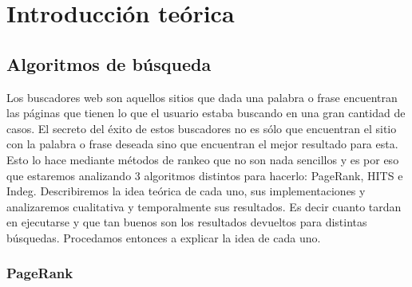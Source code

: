 \section{Introducci\'on te\'orica}

\subsection{Algoritmos de búsqueda}

Los buscadores web son aquellos sitios que dada una palabra o frase encuentran las páginas que tienen lo que el usuario estaba buscando en una gran cantidad de casos. El secreto del éxito de estos buscadores no es sólo que encuentran el sitio con la palabra o frase deseada sino que encuentran el mejor resultado para esta. \\
Esto lo hace mediante métodos de rankeo que no son nada sencillos y es por eso que estaremos analizando 3 algoritmos distintos para hacerlo: PageRank, HITS e Indeg. Describiremos la idea teórica de cada uno, sus implementaciones y analizaremos cualitativa y temporalmente sus resultados. Es decir cuanto tardan en ejecutarse y que tan buenos son los resultados devueltos para distintas búsquedas. Procedamos entonces a explicar la idea de cada uno.

\subsubsection{PageRank}

